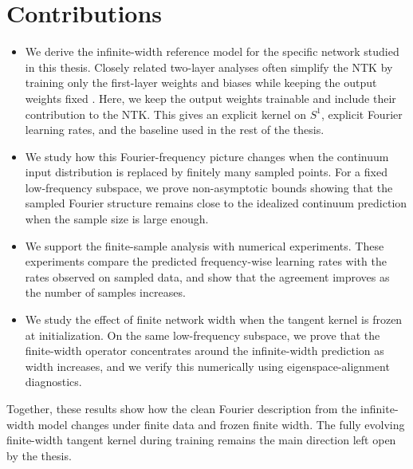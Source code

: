 \section{Contributions}
\label{sec:contributions}

\begin{itemize}
	\item We derive the infinite-width reference model for the specific network
	      studied in this thesis. Closely related two-layer analyses often
	      simplify the NTK by training only the first-layer weights and biases
	      while keeping the output weights fixed
	      \citep{basri2019convergence,basri2020frequencybiasneuralnetworks}.
	      Here, we keep the output weights trainable and include their
	      contribution to the NTK. This gives an explicit kernel on \(S^1\),
	      explicit Fourier learning rates, and the baseline used in the rest of
	      the thesis.

	\item We study how this Fourier-frequency picture changes when the continuum
	      input distribution is replaced by finitely many sampled points. For a
	      fixed low-frequency subspace, we prove non-asymptotic bounds showing
	      that the sampled Fourier structure remains close to the idealized
	      continuum prediction when the sample size is large enough.

	\item We support the finite-sample analysis with numerical experiments. These
	      experiments compare the predicted frequency-wise learning rates with
	      the rates observed on sampled data, and show that the agreement improves
	      as the number of samples increases.

	\item We study the effect of finite network width when the tangent kernel is
	      frozen at initialization. On the same low-frequency subspace, we prove
	      that the finite-width operator concentrates around the infinite-width
	      prediction as width increases, and we verify this numerically using
	      eigenspace-alignment diagnostics.
\end{itemize}

Together, these results show how the clean Fourier description from the
infinite-width model changes under finite data and frozen finite width. The
fully evolving finite-width tangent kernel during training remains the main
direction left open by the thesis.
